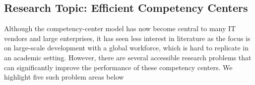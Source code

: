 %
%

\subsection{Research Topic: Efficient Competency Centers}

Although the competency-center model has now become central to many IT vendors
and large enterprises, it has seen less interest in literature as the focus is
on large-scale development with a global workforce, which is hard to replicate
in an academic setting. However, there are several accessible research problems
that can significantly improve the performance of these competency centers. We
highlight five such problem areas below

